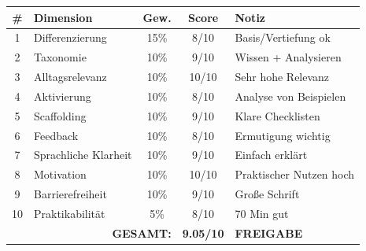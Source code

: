 \documentclass[11pt,a4paper]{article}
\begin{document}
\begin{scorebox}
\begin{tabular}{|c|l|c|c|p{3.5cm}|}
\hline
\# & Dimension & Gew. & Score & Notiz \\
\hline
1 & Differenzierung & 15\% & 8/10 & Basis/Vertiefung ok \\
2 & Taxonomie & 10\% & 9/10 & Wissen + Analysieren \\
3 & Alltagsrelevanz & 10\% & 10/10 & Sehr hohe Relevanz \\
4 & Aktivierung & 10\% & 8/10 & Analyse von Beispielen \\
5 & Scaffolding & 10\% & 9/10 & Klare Checklisten \\
6 & Feedback & 10\% & 8/10 & Ermutigung wichtig \\
7 & Sprachliche Klarheit & 10\% & 9/10 & Einfach erklärt \\
8 & Motivation & 10\% & 10/10 & Praktischer Nutzen hoch \\
9 & Barrierefreiheit & 10\% & 9/10 & Große Schrift \\
10 & Praktikabilität & 5\% & 8/10 & 70 Min gut \\
\hline
\multicolumn{3}{|r|}{\textbf{GESAMT:}} & \textbf{9.05/10} & \textcolor{successgreen}{\textbf{FREIGABE}} \\
\hline
\end{tabular}
\end{scorebox}
\end{document}

